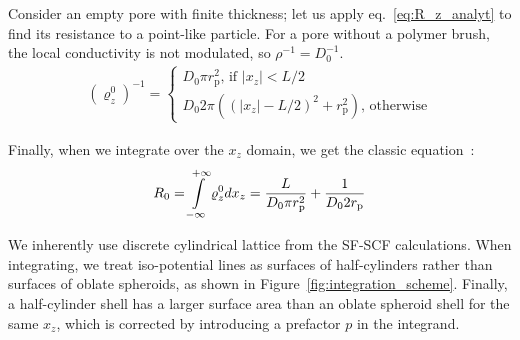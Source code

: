 \documentclass[10pt, a4paper]{article}
\begin{document}
\begin{multicols}{2}
Consider an empty pore with finite thickness; let us apply eq.~\ref{eq:R_z_analyt} to find its resistance to a point-like particle.
For a pore without a polymer brush, the local conductivity is not modulated, so $\rho^{-1} = D_0^{-1}$.
\begin{gather}
    \label{eq:r_z_empty}
    (\varrho_{z}^{0})^{-1} = 
    \begin{cases}
        D_0 \pi r_{\text{p}}^2 \text{, if } |x_z| < L/2
        \\
        D_0 2 \pi \left((|x_z|-L/2)^2 + r_{\text{p}}^2\right) \text{, otherwise} 
    \end{cases}
\end{gather}

Finally, when we integrate over the $x_z$ domain, we get the classic equation~\cite{Brunn1984}:
\begin{equation}
    \label{eq:r_empty}
    R_{0} = \int\displaylimits_{-\infty}^{+\infty} \varrho_{z}^{0} dx_z
    =\frac{L}{D_0 \pi r_{\text{p}}^2} + \frac{1}{D_0 2 r_{\text{p}}}
\end{equation}

We inherently use discrete cylindrical lattice from the SF-SCF calculations. 
When integrating, we treat iso-potential lines as surfaces of half-cylinders rather than surfaces of oblate spheroids, as shown in Figure~\ref{fig:integration_scheme}.
Finally, a half-cylinder shell has a larger surface area than an oblate spheroid shell for the same $x_z$, which is corrected by introducing a prefactor $p$ in the integrand.


\end{multicols}
\end{document}
